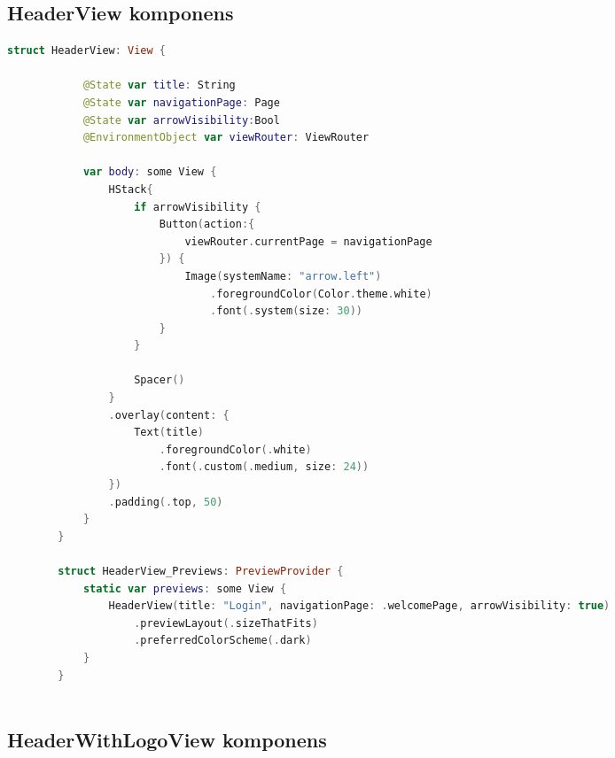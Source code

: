 \subsection*{HeaderView komponens}

\begin{spacing}{2}
\end{spacing}
\begin{minipage}{\textwidth}
    \linespread{0.8}\selectfont
    \begin{lstlisting}[language=swift]
        struct HeaderView: View {
            
            @State var title: String
            @State var navigationPage: Page
            @State var arrowVisibility:Bool
            @EnvironmentObject var viewRouter: ViewRouter
            
            var body: some View {
                HStack{
                    if arrowVisibility {
                        Button(action:{
                            viewRouter.currentPage = navigationPage
                        }) {
                            Image(systemName: "arrow.left")
                                .foregroundColor(Color.theme.white)
                                .font(.system(size: 30))
                        }
                    }
                    
                    Spacer()
                }
                .overlay(content: {
                    Text(title)
                        .foregroundColor(.white)
                        .font(.custom(.medium, size: 24))
                })
                .padding(.top, 50)
            }
        }
        
        struct HeaderView_Previews: PreviewProvider {
            static var previews: some View {
                HeaderView(title: "Login", navigationPage: .welcomePage, arrowVisibility: true)
                    .previewLayout(.sizeThatFits)
                    .preferredColorScheme(.dark)
            }
        }
        
    \end{lstlisting}   
\end{minipage}

\subsection*{HeaderWithLogoView komponens}

